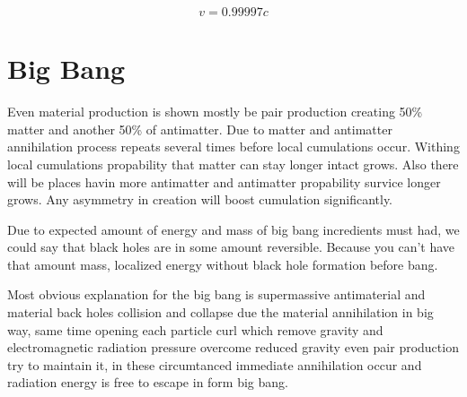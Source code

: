 

\begin{equation} \label{eq:speed}
	v=
	0.99997 c
\end{equation}

\section{Big Bang}
\label{big_bang}

Even material production is shown mostly be pair production creating 50\%
matter and another 50\% of antimatter. Due to matter and antimatter
annihilation process repeats several times before local cumulations occur.
Withing local cumulations propability that matter can stay longer intact
grows. Also there will be places havin more antimatter and antimatter
propability survice longer grows. Any asymmetry in creation will boost
cumulation significantly.

Due to expected amount of energy and mass of big bang incredients must had,
we could say that black holes are in some amount reversible. Because you can't
have that amount mass, localized energy without black hole formation before
bang.

Most obvious explanation for the big bang is supermassive antimaterial and
material back holes collision and collapse due the material annihilation in big
way, same time opening each particle curl which remove gravity and
electromagnetic radiation pressure overcome reduced gravity even pair production
try to maintain it, in these circumtanced immediate annihilation occur and
radiation energy is free to escape in form big bang.


\begin{comment}\end{comment}
